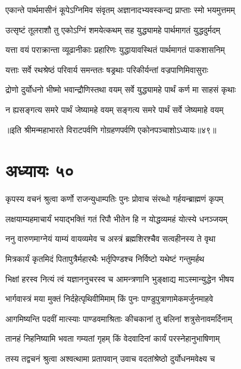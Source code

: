 \twolineshloka
{एकान्ते पार्थमासीनं कूपेऽग्निमिव संवृतम्}
{अज्ञानादभ्यवस्कन्द्य प्राप्ताः स्मो भयमुत्तमम्}


\twolineshloka
{उत्सृष्टं तूलराशौ तु एकोऽग्निं शमयेत्कथम्}
{सह युद्ध्यामहे पार्थमागतं युद्धदुर्मदम्}


\twolineshloka
{यत्ता वयं पराक्रान्ता व्यूढानीकाः प्रहारिणः}
{युद्धायावस्थितं पार्थमागतं पाकशासनिम्}


\twolineshloka
{यत्ताः सर्वे रथश्रेष्ठं परिवार्य समन्ततः}
{षड्रथाः परिकीर्यन्तां वज्रपाणिमिवासुराः}


\twolineshloka
{द्रोणो दुर्योधनो भीष्मो भवान्द्रौणिस्तथा वयम्}
{सर्वे युद्ध्यामहे पार्थं कर्ण मा साहसं कृथाः}


\twolineshloka
{न ह्यसङ्गत्य समरे पार्थं जेष्यामहे वयम्}
{सङ्गत्य समरे पार्थं सर्वे जेष्यमाहे वयम्}

॥इति श्रीमन्महाभारते विराटपर्वणि गोग्रहणपर्वणि एकोनपञ्चाशोऽध्यायः॥४९॥

\chapter{अध्यायः ५०}

\twolineshloka
{कृपस्य वचनं श्रुत्वा कर्णो राजन्युधाम्पतिः}
{पुनः प्रोवाच संरब्धो गर्हयन्ब्राह्मणं कृपम्}




\twolineshloka
{लक्षयाम्यहमाचार्यं भयाद्भक्तिं गतं रिपौ}
{भीतेन हि न योद्धव्यमहं योत्स्ये धनञ्जयम्}


\twolineshloka
{ननु वारुणमाग्नेयं याम्यं वायव्यमेव च}
{अस्त्रं ब्रह्मशिरश्चैव सत्वहीनस्य ते वृथा}


\twolineshloka
{मित्रकार्यं कृतमिदं पितापुत्रैर्महारथैः}
{भर्तृपिण्डश्च निर्विष्टो यथेष्टं गन्तुमर्हथ}


\twolineshloka
{भिक्षां हरस्व नित्यं त्वं यज्ञाननुचरस्व च}
{आमन्त्रणानि भुङ्क्षाद्य माऽस्मान्युद्धेन भीषय}


\twolineshloka
{भार्गवास्त्रं मया मुक्तं निर्दहेत्पृथिवीमिमाम्}
{किं पुनः पाण्डुपुत्राणामेकमर्जुनमाहवे}


\twolineshloka
{आगमिष्यन्ति पदवीं मात्स्याः पाण्डवमाश्रिताः}
{कीचकानां तु बलिनां शत्रुसेनावमर्दिनाम्}


\twolineshloka
{तानहं निहनिष्यामि भवता गम्यतां गृहम्}
{किं वेदवादिनां कार्यं परस्नेहानुभाषिणाम्}


\twolineshloka
{तस्य तद्वचनं श्रुत्वा अश्वत्थामा प्रतापवान्}
{उवाच वदतांश्रेष्ठो दुर्योधनमवेक्ष्य च}


